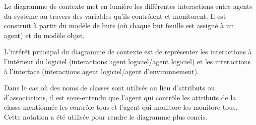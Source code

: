 Le diagramme de contexte met en lumière les différentes interactions entre 
agents du système au travers des variables qu'ils contrôlent et monitorent. 
Il est construit à partir du modèle de buts (où chaque but feuille est 
assigné à un agent) et du modèle objet.


L'intérêt principal du diagramme de contexte est de représenter les interactions
à l'intérieur du logiciel (interactions agent logiciel/agent logiciel) et
les interactions à l'interface (interactions agent logiciel/agent
d'environnement).

Dans le cas où des noms de classes sont utilisés au lieu d'attributs ou 
d'associations, il est sous-entendu que l'agent qui contrôle les attributs de
la classs mentionnée les contrôle tous et l'agent qui monitore les monitore 
tous.  Cette notation a été utilisée pour rendre le diagramme plus concis.


